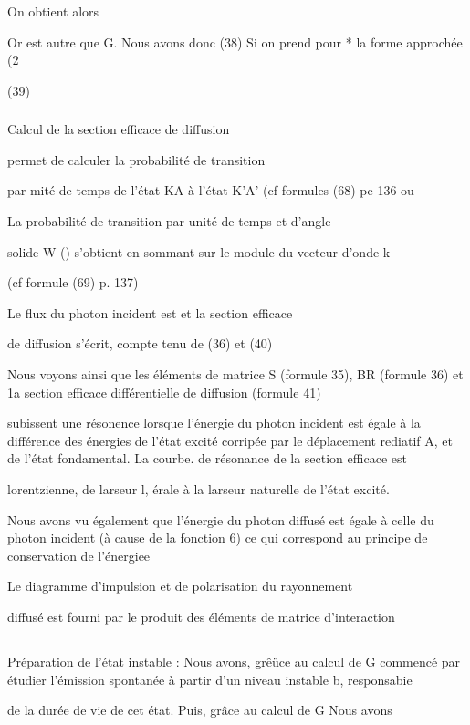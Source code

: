 On obtient alors

Or  est autre que G. Nous avons donc
(38)
Si on prend pour * la forme approchée (2%

(39)

\subsubsection{} Calcul de la section efficace de diffusion%

 permet de calculer la probabilité de transition

par mité de temps de l'état KA à l'état K'A' (cf formules (68) pe 136 ou

La probabilité de transition par unité de temps et d'angle

solide W () s'obtient en sommant sur le module du vecteur d'onde k

(cf formule (69) p. 137)

Le flux du photon incident est et la section efficace

de diffusion s'écrit, compte tenu de (36) et (40)

Nous voyons ainsi que les éléments de matrice S (formule 35),
BR (formule 36) et 1a section efficace différentielle de diffusion (formule 41)

subissent une résonence lorsque l'énergie du photon incident est égale à la
différence des énergies de l'état excité corripée par le déplacement rediatif
A, et de l'état fondamental. La courbe. de résonance de la section efficace est

lorentzienne, de larseur l, érale à la larseur naturelle de l'état excité.

Nous avons vu également que l'énergie du photon diffusé est
égale à celle du photon incident (à cause de la fonction 6) ce qui correspond au principe de conservation de l'énergiee

Le diagramme d'impulsion et de polarisation du rayonnement

diffusé est fourni par le produit des éléments de matrice d'interaction

\subsection{} Préparation de l'état instable :%
Nous avons, grêüce au calcul de G  commencé
par étudier l'émission spontanée à partir d'un niveau instable b, responsabie

de la durée de vie de cet état. Puis, grâce au calcul de G Nous avons

